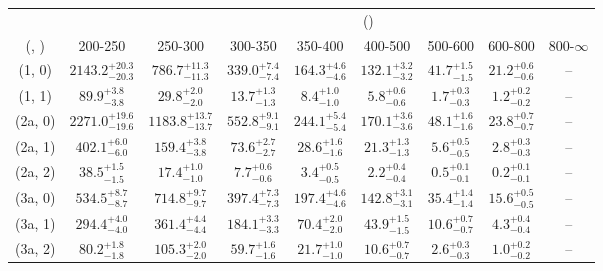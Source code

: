 \begin{table}[h!]
\tiny
\centering
{}
\begin{tabular}
{ccccccccc}
	\hline\hline
&	& \multicolumn{8}{c}{\scalht (\gev)} \\ 
	 (\njet,  \nb) & 200-250 & 250-300 & 300-350 & 350-400 & 400-500 & 500-600 & 600-800 & 800-$\infty$ \\ [0.8ex] 
\hline
	(1, 0) & $2143.2^{+ 20.3 }_{- 20.3 }$ & $786.7^{+ 11.3 }_{- 11.3 }$ & $339.0^{+ 7.4 }_{- 7.4 }$ & $164.3^{+ 4.6 }_{- 4.6 }$ & $132.1^{+ 3.2 }_{- 3.2 }$ & $41.7^{+ 1.5 }_{- 1.5 }$ & $21.2^{+ 0.6 }_{- 0.6 }$ & -- \\[0.5ex] 
	(1, 1) & $89.9^{+ 3.8 }_{- 3.8 }$ & $29.8^{+ 2.0 }_{- 2.0 }$ & $13.7^{+ 1.3 }_{- 1.3 }$ & $8.4^{+ 1.0 }_{- 1.0 }$ & $5.8^{+ 0.6 }_{- 0.6 }$ & $1.7^{+ 0.3 }_{- 0.3 }$ & $1.2^{+ 0.2 }_{- 0.2 }$ & -- \\[0.5ex] 
	(2a, 0) & $2271.0^{+ 19.6 }_{- 19.6 }$ & $1183.8^{+ 13.7 }_{- 13.7 }$ & $552.8^{+ 9.1 }_{- 9.1 }$ & $244.1^{+ 5.4 }_{- 5.4 }$ & $170.1^{+ 3.6 }_{- 3.6 }$ & $48.1^{+ 1.6 }_{- 1.6 }$ & $23.8^{+ 0.7 }_{- 0.7 }$ & -- \\[0.5ex] 
	(2a, 1) & $402.1^{+ 6.0 }_{- 6.0 }$ & $159.4^{+ 3.8 }_{- 3.8 }$ & $73.6^{+ 2.7 }_{- 2.7 }$ & $28.6^{+ 1.6 }_{- 1.6 }$ & $21.3^{+ 1.3 }_{- 1.3 }$ & $5.6^{+ 0.5 }_{- 0.5 }$ & $2.8^{+ 0.3 }_{- 0.3 }$ & -- \\[0.5ex] 
	(2a, 2) & $38.5^{+ 1.5 }_{- 1.5 }$ & $17.4^{+ 1.0 }_{- 1.0 }$ & $7.7^{+ 0.6 }_{- 0.6 }$ & $3.4^{+ 0.5 }_{- 0.5 }$ & $2.2^{+ 0.4 }_{- 0.4 }$ & $0.5^{+ 0.1 }_{- 0.1 }$ & $0.2^{+ 0.1 }_{- 0.1 }$ & -- \\[0.5ex] 
	(3a, 0) & $534.5^{+ 8.7 }_{- 8.7 }$ & $714.8^{+ 9.7 }_{- 9.7 }$ & $397.4^{+ 7.3 }_{- 7.3 }$ & $197.4^{+ 4.6 }_{- 4.6 }$ & $142.8^{+ 3.1 }_{- 3.1 }$ & $35.4^{+ 1.4 }_{- 1.4 }$ & $15.6^{+ 0.5 }_{- 0.5 }$ & -- \\[0.5ex] 
	(3a, 1) & $294.4^{+ 4.0 }_{- 4.0 }$ & $361.4^{+ 4.4 }_{- 4.4 }$ & $184.1^{+ 3.3 }_{- 3.3 }$ & $70.4^{+ 2.0 }_{- 2.0 }$ & $43.9^{+ 1.5 }_{- 1.5 }$ & $10.6^{+ 0.7 }_{- 0.7 }$ & $4.3^{+ 0.4 }_{- 0.4 }$ & -- \\[0.5ex] 
	(3a, 2) & $80.2^{+ 1.8 }_{- 1.8 }$ & $105.3^{+ 2.0 }_{- 2.0 }$ & $59.7^{+ 1.6 }_{- 1.6 }$ & $21.7^{+ 1.0 }_{- 1.0 }$ & $10.6^{+ 0.7 }_{- 0.7 }$ & $2.6^{+ 0.3 }_{- 0.3 }$ & $1.0^{+ 0.2 }_{- 0.2 }$ & -- \\[0.5ex] 

\end{tabular}
\end{table}

